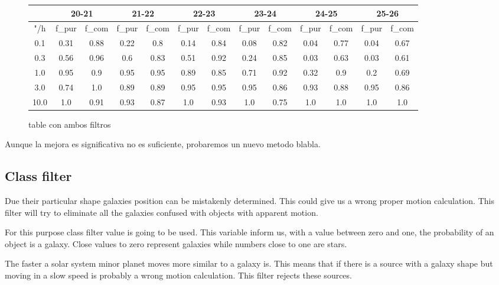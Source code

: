 \documentclass{article}
\begin{document}
\begin{figure}[H]
\centering
\begin{tabular}{|c|c|c|c|c|c|c|c|c|c|c|c|c|}
\hline
\multicolumn{1}{|c|}{} & \multicolumn{2}{|c|}{20-21} & \multicolumn{2}{|c|}{21-22} & \multicolumn{2}{|c|}{22-23} & \multicolumn{2}{|c|}{23-24} & \multicolumn{2}{|c|}{24-25} & \multicolumn{2}{|c|}{25-26}\\
\hline \hline
"/h & f\_pur & f\_com & f\_pur & f\_com & f\_pur & f\_com & f\_pur & f\_com & f\_pur & f\_com & f\_pur & f\_com \\
\hline
0.1 & 0.31 & 0.88 & 0.22 & 0.8 & 0.14 & 0.84 & 0.08 & 0.82 & 0.04 & 0.77 & 0.04 & 0.67\\
\hline
0.3 & 0.56 & 0.96 & 0.6 & 0.83 & 0.51 & 0.92 & 0.24 & 0.85 & 0.03 & 0.63 & 0.03 & 0.61\\
\hline
1.0 & 0.95 & 0.9 & 0.95 & 0.95 & 0.89 & 0.85 & 0.71 & 0.92 & 0.32 & 0.9 & 0.2 & 0.69\\
\hline
3.0 & 0.74 & 1.0 & 0.89 & 0.89 & 0.95 & 0.95 & 0.95 & 0.86 & 0.93 & 0.88 & 0.95 & 0.86\\
\hline
10.0 & 1.0 & 0.91 & 0.93 & 0.87 & 1.0 & 0.93 & 1.0 & 0.75 & 1.0 & 1.0 & 1.0 & 1.0\\
\hline
\end{tabular}
\caption{table con ambos filtros}
\end{figure}

Aunque la mejora es significativa no es suficiente, probaremos un nuevo metodo blabla.

\subsection{Class filter}
Due their particular shape galaxies position can be mistakenly determined. This could give us a wrong proper motion calculation. This filter will try to eliminate all the galaxies confused with objects with apparent motion.
\par For this purpose class filter value is going to be used. This variable inform us, with a value between zero and one, the probability of an object is a galaxy. Close values to zero represent galaxies while numbers close to one are stars.
\par The faster a solar system minor planet moves more similar to a galaxy is. This means that if there is a source with a galaxy shape but moving in a slow speed is probably a wrong motion calculation. This filter rejects these sources.
\end{document}
